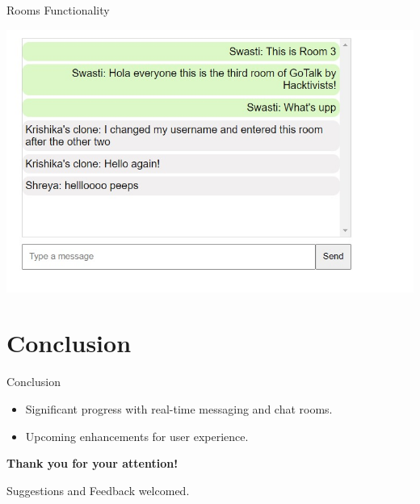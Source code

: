\documentclass{beamer}
\begin{document}
\begin{frame}{Rooms Functionality}
\begin{minipage}[t]{0.3\textwidth}
            \includegraphics[width=\textwidth]{room3.jpg}
        \end{minipage}
\end{frame}


\section{Conclusion}

\begin{frame}{Conclusion}
    \begin{itemize}
        \item Significant progress with real-time messaging and chat rooms.
        \item Upcoming enhancements for user experience.
    \end{itemize}
    \vfill
    \begin{center}
        \textbf{Thank you for your attention!}
    \end{center}
    \begin{center}
        Suggestions and Feedback welcomed.
    \end{center}
\end{frame}
\end{document}
